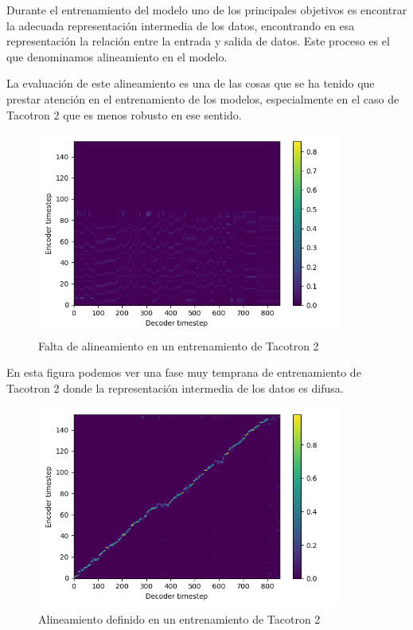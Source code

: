 Durante el entrenamiento del modelo uno de los principales objetivos es encontrar la adecuada representación intermedia de los datos, encontrando en esa representación la relación entre la entrada y salida de datos. Este proceso es el que denominamos alineamiento en el modelo.

La evaluación de este alineamiento es una de las cosas que se ha tenido que prestar atención en el entrenamiento de los modelos, especialmente en el caso de Tacotron 2 que es menos robusto en ese sentido.

\begin{figure}[H]
\centering
\includegraphics[width=10cm]{5_resultados_img/align-taco1.png}
\caption{Falta de alineamiento en un entrenamiento de Tacotron 2}
\label{fig:figure1}
\end{figure}

En esta figura podemos ver una fase muy temprana de entrenamiento de Tacotron 2 donde la representación intermedia de los datos es difusa.

\begin{figure}[H]
\centering
\includegraphics[width=10cm]{5_resultados_img/align-taco2.png}
\caption{Alineamiento definido en un entrenamiento de Tacotron 2}
\label{fig:figure1}
\end{figure}


